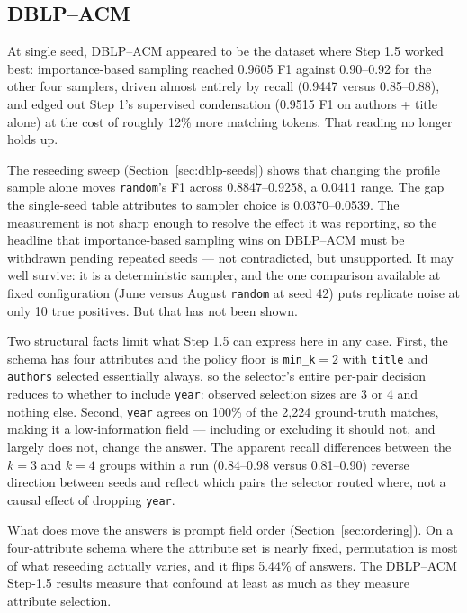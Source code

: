 \documentclass[11pt]{article}
\begin{document}
\subsection{DBLP--ACM}

At single seed, DBLP--ACM appeared to be the dataset where Step 1.5 worked best:
importance-based sampling reached 0.9605 F1 against 0.90--0.92 for the other four
samplers, driven almost entirely by recall (0.9447 versus 0.85--0.88), and edged out
Step 1's supervised condensation (0.9515 F1 on authors + title alone) at the cost of
roughly 12\% more matching tokens. That reading no longer holds up.

The reseeding sweep (Section~\ref{sec:dblp-seeds}) shows that changing the profile
sample alone moves \texttt{random}'s F1 across 0.8847--0.9258, a 0.0411 range. The
gap the single-seed table attributes to sampler choice is 0.0370--0.0539. The
measurement is not sharp enough to resolve the effect it was reporting, so the
headline that importance-based sampling wins on DBLP--ACM must be withdrawn pending
repeated seeds --- not contradicted, but unsupported. It may well survive: it is a
deterministic sampler, and the one comparison available at fixed configuration
(June versus August \texttt{random} at seed 42) puts replicate noise at only 10 true
positives. But that has not been shown.

Two structural facts limit what Step 1.5 can express here in any case. First, the
schema has four attributes and the policy floor is \texttt{min\_k}${}=2$ with
\texttt{title} and \texttt{authors} selected essentially always, so the selector's
entire per-pair decision reduces to whether to include \texttt{year}: observed
selection sizes are 3 or 4 and nothing else. Second, \texttt{year} agrees on 100\% of
the 2{,}224 ground-truth matches, making it a low-information field --- including or
excluding it should not, and largely does not, change the answer. The apparent
recall differences between the $k=3$ and $k=4$ groups within a run (0.84--0.98 versus
0.81--0.90) reverse direction between seeds and reflect which pairs the selector
routed where, not a causal effect of dropping \texttt{year}.

What does move the answers is prompt field order (Section~\ref{sec:ordering}). On a
four-attribute schema where the attribute set is nearly fixed, permutation is most of
what reseeding actually varies, and it flips 5.44\% of answers. The DBLP--ACM
Step-1.5 results measure that confound at least as much as they measure attribute
selection.
\end{document}

